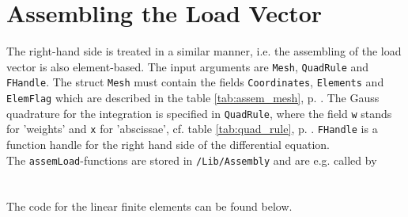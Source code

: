 

\section{Assembling the Load Vector} \label{sect:assem_load} 

 The right-hand side is treated in a similar manner, i.e. the assembling of the load vector is also element-based. The input arguments are {\tt Mesh}, {\tt QuadRule} and {\tt FHandle}. The struct {\tt Mesh} must contain the fields {\tt Coordinates}, {\tt Elements} and {\tt ElemFlag} which are described in the table \ref{tab:assem_mesh}, p. \pageref{tab:assem_mesh}. The Gauss quadrature for the integration is specified in {\tt QuadRule}, where the field {\tt w} stands for 'weights' and {\tt x} for 'abscissae', cf. table \ref{tab:quad_rule}, p. \pageref{tab:quad_rule}. {\tt FHandle} is a function handle for the right hand side of the differential equation. \\

 The {\tt assemLoad}-functions are stored in {\tt /Lib/Assembly} and are e.g. called by \\

 \\
 \\

The code for the linear finite elements can be found below.

